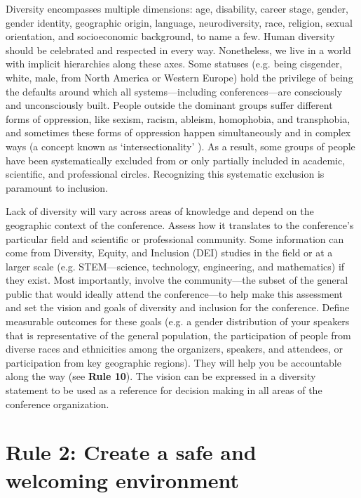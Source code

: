 \documentclass[10pt,letterpaper]{article}
\begin{document}
Diversity encompasses multiple dimensions: age, disability, career stage, gender, gender identity, geographic origin, language, neurodiversity, race, religion, sexual orientation, and socioeconomic background, to name a few.
Human diversity should be celebrated and respected in every way. 
Nonetheless, we live in a world with implicit hierarchies along these axes. 
Some statuses (e.g. being cisgender, white, male, from North America or Western Europe) hold the privilege of being the defaults around which all systems—including conferences—are consciously and unconsciously built. 
People outside the dominant groups suffer different forms of oppression, like sexism, racism, ableism, homophobia, and transphobia, and sometimes these forms of oppression happen simultaneously and in complex ways (a concept known as `intersectionality' \cite{crenshawDemarginalizingIntersectionRace1989}).
As a result, some groups of people have been systematically excluded from or only partially included in academic, scientific, and professional circles.
Recognizing this systematic exclusion is paramount to inclusion.

Lack of diversity will vary across areas of knowledge and depend on the geographic context of the conference.
Assess how it translates to the conference's particular field and scientific or professional community.
Some information can come from Diversity, Equity, and Inclusion (DEI) studies in the field or at a larger scale (e.g. STEM---science, technology, engineering, and mathematics) if they exist. 
Most importantly, involve the community---the subset of the general public that would ideally attend the conference---to help make this assessment and set the vision and goals of diversity and inclusion for the conference.
Define measurable outcomes for these goals (e.g. a gender distribution of your speakers that is representative of the general population, the participation of people from diverse races and ethnicities among the organizers, speakers, and attendees, or participation from key geographic regions). 
They will help you be accountable along the way (see \textbf{Rule 10}).
The vision can be expressed in a diversity statement to be used as a reference for decision making in all areas of the conference organization.

\section*{Rule 2: Create a safe and welcoming environment}
\label{rule_inclusion}
\end{document}
